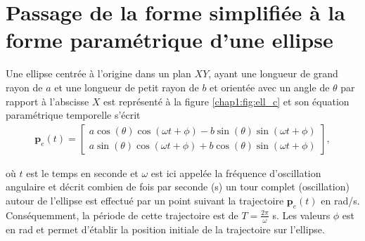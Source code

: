 \chapter[Forme paramétrique à forme simplifiée]{Passage de la forme simplifiée à la forme paramétrique d'une ellipse}

Une ellipse centrée à l'origine dans un plan $XY$, ayant une longueur de grand rayon de $a$ et une longueur de petit rayon de $b$ et orientée avec un angle de $\theta$ par rapport à l’abscisse $X$  est représenté à la figure \ref{chap1:fig:ell_c} et son équation paramétrique temporelle s'écrit 
\begin{align}
\mathbf{p}_e(t) =
\begin{bmatrix}
a\cos(\theta)\cos(\omega t+\phi)-b\sin(\theta)\sin(\omega t+\phi)\\
a\sin(\theta)\cos(\omega t+\phi)+b\cos(\theta)\sin(\omega t+\phi)
\end{bmatrix}, \label{annC:eq:ell_base}
\end{align}

où $t$ est le temps en seconde et $\omega$ est ici appelée la fréquence d'oscillation angulaire et décrit combien de fois par seconde (s) un tour complet (oscillation) autour de l’ellipse est effectué par un point suivant la trajectoire $\mathbf{p}_e(t)$ en rad/s. Conséquemment, la période de cette trajectoire est de $T = \frac{2\pi}{\omega}$ s. Les valeurs $\phi$ est en rad et  permet d'établir la position initiale de la trajectoire sur l'ellipse. 

